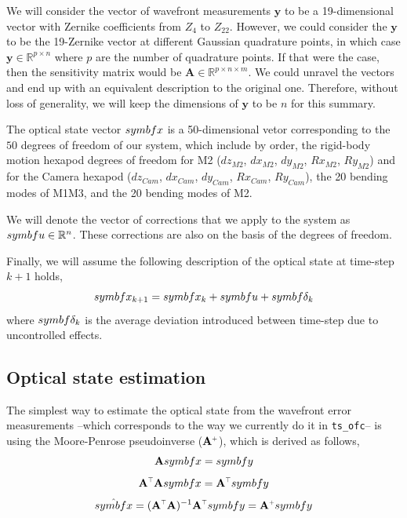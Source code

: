 \documentclass[SE,authoryear,toc]{lsstdoc}
\renewcommand{\v}[1]{\mathbf{#1}}
\newcommand{\plus}{\scalebox{0.6}{$+$}}
\newcommand{\tr}{\scalebox{0.6}{$\top$}}
\begin{document}
We will consider the vector of wavefront measurements $\symbf{y}$ to be a 19-dimensional vector with Zernike coefficients from $Z_4$ to $Z_{22}$. However, we could consider the $\symbf{y}$ to be the 19-Zernike vector at different Gaussian quadrature points, in which case $\symbf{y} \in \mathbb{R}^{p \times n}$ where $p$ are the number of quadrature points. If that were the case, then the sensitivity matrix would be $\v{A} \in \mathbb{R}^{p \times n \times m}$. We could unravel the vectors and end up with an equivalent description to the original one. Therefore, without loss of generality, we will keep the dimensions of $\symbf{y}$ to be $n$ for this summary.

The optical state vector  $\\symbf{x}$ is a 50-dimensional vetor corresponding to the $50$ degrees of freedom of our system, which include by order, the rigid-body motion hexapod degrees of freedom for M2 ($dz_{M2}$, $dx_{M2}$, $dy_{M2}$, $Rx_{M2}$, $Ry_{M2}$) and for the Camera hexapod ($dz_{Cam}$, $dx_{Cam}$, $dy_{Cam}$, $Rx_{Cam}$, $Ry_{Cam}$), the 20 bending modes of M1M3, and the 20 bending modes of M2. 

We will denote the vector of corrections that we apply to the system as $\\symbf{u} \in \mathbb{R}^n$. These corrections are also on the basis of the degrees of freedom.

Finally, we will assume the following description of the optical state at time-step $k + 1$ holds, 
\begin{equation}\label{eq3}
    \\symbf{x}_{k + 1} = \\symbf{x}_{k} + \\symbf{u} + \\symbf{\delta}_{k}
\end{equation}
where $\\symbf{\delta}_{k}$ is the average deviation introduced between time-step due to uncontrolled effects.

\subsection*{Optical state estimation}
The simplest way to estimate the optical state from the wavefront error measurements --which corresponds to the way we currently do it in \texttt{ts\_ofc}-- is using the Moore-Penrose pseudoinverse ($\v{A}^{\plus}$), which is derived as follows,
\begin{equation*}
     \v{A}\\symbf{x} = \\symbf{y}
\end{equation*}
\begin{equation*}
     \v{A}^{\tr}\v{A}\\symbf{x} = \v{A}^{\tr}\\symbf{y}
\end{equation*}
\begin{equation*}
    \hat{\\symbf{x}} = (\v{A}^{\tr} \v{A})^{-1}\v{A}^{\tr}\\symbf{y} = \v{A}^{\plus}\\symbf{y}
\end{equation*}
\end{document}
